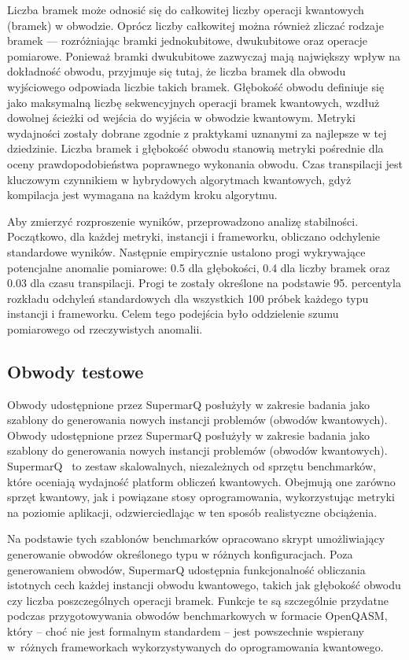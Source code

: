 Liczba bramek może odnosić się do całkowitej liczby operacji kwantowych (bramek) w obwodzie. Oprócz liczby całkowitej można również zliczać rodzaje bramek — rozróżniając bramki jednokubitowe, dwukubitowe oraz operacje pomiarowe. Ponieważ bramki dwukubitowe zazwyczaj mają największy wpływ na dokładność obwodu, przyjmuje się tutaj, że liczba bramek dla obwodu wyjściowego odpowiada liczbie takich bramek. Głębokość obwodu definiuje się jako maksymalną liczbę sekwencyjnych operacji bramek kwantowych, wzdłuż dowolnej ścieżki od wejścia do wyjścia w obwodzie kwantowym. Metryki wydajności zostały dobrane zgodnie z praktykami uznanymi za najlepsze w tej dziedzinie. Liczba bramek i głębokość obwodu stanowią metryki pośrednie dla oceny prawdopodobieństwa poprawnego wykonania obwodu. Czas transpilacji jest kluczowym czynnikiem w hybrydowych algorytmach kwantowych, gdyż kompilacja jest wymagana na każdym kroku algorytmu.

Aby zmierzyć rozproszenie wyników, przeprowadzono analizę stabilności. Początkowo, dla każdej metryki, instancji i frameworku, obliczano odchylenie standardowe wyników. Następnie empirycznie ustalono progi wykrywające potencjalne anomalie pomiarowe: 0.5 dla głębokości, 0.4 dla liczby bramek oraz 0.03 dla czasu transpilacji. Progi te zostały określone na podstawie 95. percentyla rozkładu odchyleń standardowych dla wszystkich 100 próbek każdego typu instancji i frameworku. Celem tego podejścia było oddzielenie szumu pomiarowego od rzeczywistych anomalii.

\subsection{Obwody testowe}

Obwody udostępnione przez SupermarQ posłużyły w zakresie badania jako szablony do generowania nowych instancji problemów (obwodów kwantowych). Obwody udostępnione przez SupermarQ posłużyły w zakresie badania jako szablony do generowania nowych instancji problemów (obwodów kwantowych). 
SupermarQ~\cite{tomesh2022supermarqscalablequantumbenchmark} to zestaw skalowalnych, niezależnych od sprzętu benchmarków, które oceniają wydajność platform obliczeń kwantowych. Obejmują one zarówno sprzęt kwantowy, jak i powiązane stosy oprogramowania, wykorzystując metryki na poziomie aplikacji, odzwierciedlając w ten sposób realistyczne obciążenia.

Na podstawie tych szablonów benchmarków opracowano skrypt umożliwiający generowanie obwodów określonego typu w różnych konfiguracjach. Poza generowaniem obwodów, SupermarQ udostępnia funkcjonalność obliczania istotnych cech każdej instancji obwodu kwantowego, takich jak głębokość obwodu czy liczba poszczególnych operacji bramek. Funkcje te są szczególnie przydatne podczas przygotowywania obwodów benchmarkowych w formacie OpenQASM, który – choć nie jest formalnym standardem – jest  powszechnie wspierany w~różnych frameworkach wykorzystywanych do oprogramowania kwantowego.

